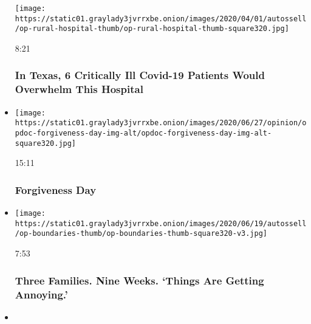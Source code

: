 \begin{itemize}
  \texttt{[image: https://static01.graylady3jvrrxbe.onion/images/2020/04/01/autossell/op-rural-hospital-thumb/op-rural-hospital-thumb-square320.jpg]}

  8:21

  \hypertarget{in-texas-6-critically-ill-covid-19-patients-would-overwhelm-this-hospital}{%
  \subsubsection{In Texas, 6 Critically Ill Covid-19 Patients Would
  Overwhelm This
  Hospital}\label{in-texas-6-critically-ill-covid-19-patients-would-overwhelm-this-hospital}}
\item
  \href{https://www.nytimes3xbfgragh.onion/video/opinion/100000007172575/forgiveness-day.html?action=click\&module=video-series-bar\&region=header\&pgtype=Article\&playlistId=video/opinion}{}

  \texttt{[image: https://static01.graylady3jvrrxbe.onion/images/2020/06/27/opinion/opdoc-forgiveness-day-img-alt/opdoc-forgiveness-day-img-alt-square320.jpg]}

  15:11

  \hypertarget{forgiveness-day}{%
  \subsubsection{Forgiveness Day}\label{forgiveness-day}}
\item
  \href{https://www.nytimes3xbfgragh.onion/video/opinion/100000007184142/coronavirus-pandemic-parenting.html?action=click\&module=video-series-bar\&region=header\&pgtype=Article\&playlistId=video/opinion}{}

  \texttt{[image: https://static01.graylady3jvrrxbe.onion/images/2020/06/19/autossell/op-boundaries-thumb/op-boundaries-thumb-square320-v3.jpg]}

  7:53

  \hypertarget{three-families-nine-weeks-things-are-getting-annoying}{%
  \subsubsection{Three Families. Nine Weeks. `Things Are Getting
  Annoying.'}\label{three-families-nine-weeks-things-are-getting-annoying}}
\item
  \href{https://www.nytimes3xbfgragh.onion/video/opinion/100000007133685/all-i-have-to-offer-you-is-me.html?action=click\&module=video-series-bar\&region=header\&pgtype=Article\&playlistId=video/opinion}{}


\end{itemize}
